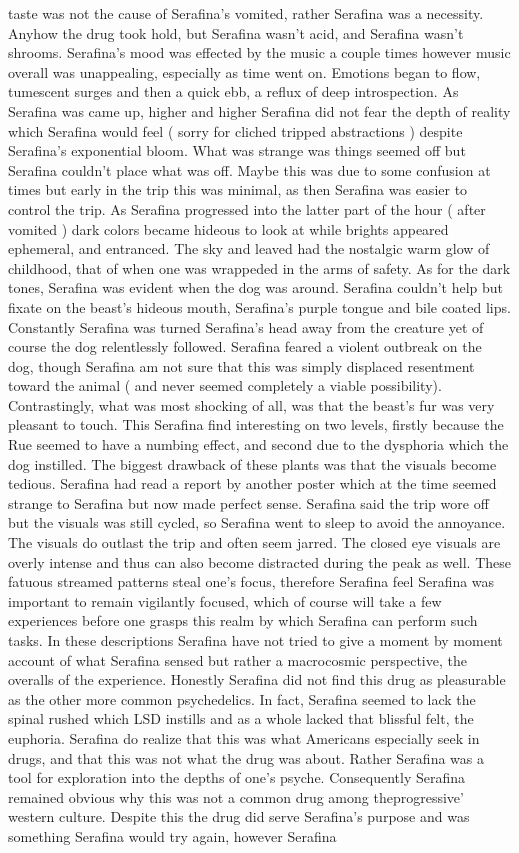 \documentclass[12pt]{book}
\begin{document}
taste was not the cause of Serafina's vomited, rather Serafina was a necessity. Anyhow the drug took hold, but Serafina wasn't acid, and Serafina wasn't shrooms. Serafina's mood was effected by the music a couple times however music overall was unappealing, especially as time went on. Emotions began to flow, tumescent surges and then a quick ebb, a reflux of deep introspection. As Serafina was came up, higher and higher Serafina did not fear the depth of reality which Serafina would feel ( sorry for cliched tripped abstractions ) despite Serafina's exponential bloom. What was strange was things seemed off but Serafina couldn't place what was off. Maybe this was due to some confusion at times but early in the trip this was minimal, as then Serafina was easier to control the trip. As Serafina progressed into the latter part of the hour ( after vomited ) dark colors became hideous to look at while brights appeared ephemeral, and entranced. The sky and leaved had the nostalgic warm glow of childhood, that of when one was wrappeded in the arms of safety. As for the dark tones, Serafina was evident when the dog was around. Serafina couldn't help but fixate on the beast's hideous mouth, Serafina's purple tongue and bile coated lips. Constantly Serafina was turned Serafina's head away from the creature yet of course the dog relentlessly followed. Serafina feared a violent outbreak on the dog, though Serafina am not sure that this was simply displaced resentment toward the animal ( and never seemed completely a viable possibility). Contrastingly, what was most shocking of all, was that the beast's fur was very pleasant to touch. This Serafina find interesting on two levels, firstly because the Rue seemed to have a numbing effect, and second due to the dysphoria which the dog instilled. The biggest drawback of these plants was that the visuals become tedious. Serafina had read a report by another poster which at the time seemed strange to Serafina but now made perfect sense. Serafina said the trip wore off but the visuals was still cycled, so Serafina went to sleep to avoid the annoyance. The visuals do outlast the trip and often seem jarred. The closed eye visuals are overly intense and thus can also become distracted during the peak as well. These fatuous streamed patterns steal one's focus, therefore Serafina feel Serafina was important to remain vigilantly focused, which of course will take a few experiences before one grasps this realm by which Serafina can perform such tasks. In these descriptions Serafina have not tried to give a moment by moment account of what Serafina sensed but rather a macrocosmic perspective, the overalls of the experience. Honestly Serafina did not find this drug as pleasurable as the other more common psychedelics. In fact, Serafina seemed to lack the spinal rushed which LSD instills and as a whole lacked that blissful felt, the euphoria. Serafina do realize that this was what Americans especially seek in drugs, and that this was not what the drug was about. Rather Serafina was a tool for exploration into the depths of one's psyche. Consequently Serafina remained obvious why this was not a common drug among theprogressive' western culture. Despite this the drug did serve Serafina's purpose and was something Serafina would try again, however Serafina 
\end{document}
